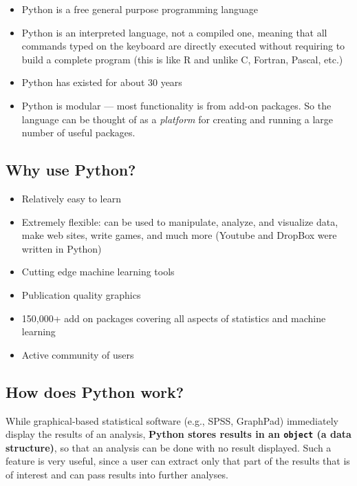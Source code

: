\documentclass[
]{book}
\providecommand{\tightlist}{%
  \setlength{\itemsep}{0pt}\setlength{\parskip}{0pt}}
\begin{document}
\begin{itemize}
\tightlist
\item
  Python is a free general purpose programming language
\item
  Python is an interpreted language, not a compiled one, meaning that all commands
  typed on the keyboard are directly executed without requiring to build a complete
  program (this is like R and unlike C, Fortran, Pascal, etc.)
\item
  Python has existed for about 30 years
\item
  Python is modular --- most functionality is from add-on packages. So the language can
  be thought of as a \emph{platform} for creating and running a large number of useful packages.
\end{itemize}

\hypertarget{why-use-python}{%
\subsection{Why use Python?}\label{why-use-python}}

\begin{itemize}
\tightlist
\item
  Relatively easy to learn
\item
  Extremely flexible: can be used to manipulate, analyze, and visualize data,
  make web sites, write games, and much more (Youtube and DropBox were written in Python)
\item
  Cutting edge machine learning tools
\item
  Publication quality graphics
\item
  150,000+ add on packages covering all aspects of statistics and machine learning
\item
  Active community of users
\end{itemize}

\hypertarget{how-does-python-work}{%
\subsection{How does Python work?}\label{how-does-python-work}}

While graphical-based statistical software (e.g., SPSS, GraphPad) immediately display
the results of an analysis, \textbf{Python stores results in an \texttt{object} (a data structure)},
so that an analysis can be done with no result displayed. Such a feature is very
useful, since a user can extract only that part of the results that is of interest
and can pass results into further analyses.
\end{document}
